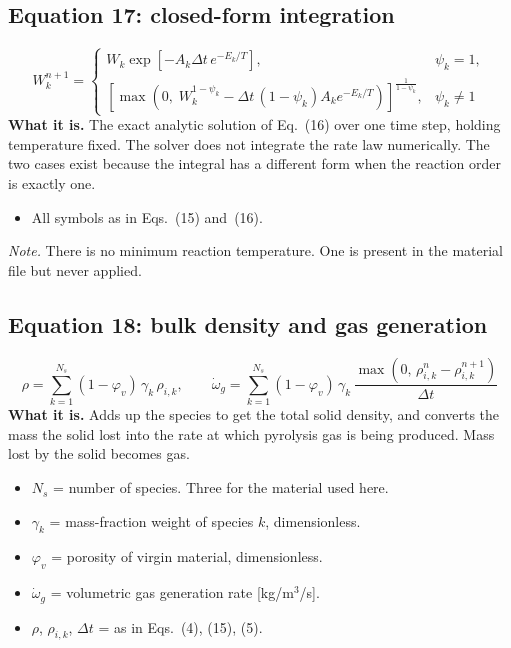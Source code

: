\documentclass[11pt]{article}
\begin{document}
\subsection*{Equation 17: closed-form integration}
\begin{equation}
W^{n+1}_k =
\begin{cases}
W_k \exp\!\left[-A_k \Delta t\, e^{-E_k/T}\right], & \psi_k = 1, \\[8pt]
\left[\max\!\left(0,\; W_k^{1-\psi_k} - \Delta t\,(1-\psi_k) A_k e^{-E_k/T}\right)\right]^{\frac{1}{1-\psi_k}},
& \psi_k \neq 1
\end{cases}
\end{equation}
\textbf{What it is.} The exact analytic solution of Eq.~(16) over one time step,
holding temperature fixed. The solver does not integrate the rate law
numerically. The two cases exist because the integral has a different form when
the reaction order is exactly one.
\begin{itemize}
  \item All symbols as in Eqs.~(15) and~(16).
\end{itemize}
\textit{Note.} There is no minimum reaction temperature. One is present in the
material file but never applied.

\subsection*{Equation 18: bulk density and gas generation}
\begin{equation}
\rho = \sum_{k=1}^{N_s} (1-\varphi_v)\,\gamma_k\, \rho_{i,k},
\qquad
\dot\omega_g = \sum_{k=1}^{N_s} (1-\varphi_v)\,\gamma_k\,
\frac{\max\!\left(0,\, \rho^{n}_{i,k} - \rho^{n+1}_{i,k}\right)}{\Delta t}
\end{equation}
\textbf{What it is.} Adds up the species to get the total solid density, and
converts the mass the solid lost into the rate at which pyrolysis gas is being
produced. Mass lost by the solid becomes gas.
\begin{itemize}
  \item $N_s$ = number of species. Three for the material used here.
  \item $\gamma_k$ = mass-fraction weight of species $k$, dimensionless.
  \item $\varphi_v$ = porosity of virgin material, dimensionless.
  \item $\dot\omega_g$ = volumetric gas generation rate [kg/m$^3$/s].
  \item $\rho$, $\rho_{i,k}$, $\Delta t$ = as in Eqs.~(4), (15), (5).
\end{itemize}
\end{document}
